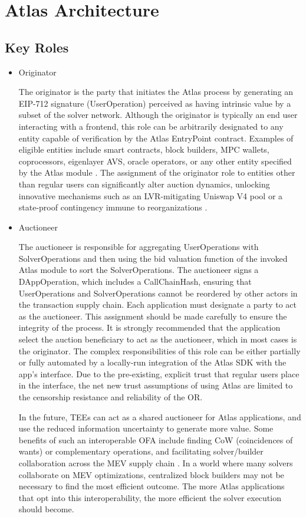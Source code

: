 \documentclass{article}
\begin{document}
\section{Atlas Architecture}

\subsection{Key Roles}
\begin{itemize}
\item Originator

The originator is the party that initiates the Atlas process by generating an EIP-712 signature (UserOperation) perceived as having intrinsic value by a subset of the solver network. Although the originator is typically an end user interacting with a frontend, this role can be arbitrarily designated to any entity capable of verification by the Atlas EntryPoint contract. Examples of eligible entities include smart contracts, block builders, MPC wallets, coprocessors, eigenlayer AVS, oracle operators, or any other entity specified by the Atlas module \cite{eigen}. The assignment of the originator role to entities other than regular users can significantly alter auction dynamics, unlocking innovative mechanisms such as an LVR-mitigating Uniswap V4 pool or a state-proof contingency immune to reorganizations \cite{lvr}. 


\item Auctioneer

The auctioneer is responsible for aggregating UserOperations with SolverOperations and then using the bid valuation function of the invoked Atlas module to sort the SolverOperations. The auctioneer signs a DAppOperation, which includes a CallChainHash, ensuring that UserOperations and SolverOperations cannot be reordered by other actors in the transaction supply chain. Each application must designate a party to act as the auctioneer. This assignment should be made carefully to ensure the integrity of the process. It is strongly recommended that the application select the auction beneficiary to act as the auctioneer, which in most cases is the originator. The complex responsibilities of this role can be either partially or fully automated by a locally-run integration of the Atlas SDK with the app’s interface. Due to the pre-existing, explicit trust that regular users place in the interface, the net new trust assumptions of using Atlas are limited to the censorship resistance and reliability of the OR. 

In the future, TEEs can act as a shared auctioneer for Atlas applications, and use the reduced information uncertainty to generate more value. Some benefits of such an interoperable OFA include finding CoW (coincidences of wants) or complementary operations, and facilitating solver/builder collaboration across the MEV supply chain \cite{cow}. In a world where many solvers collaborate on MEV optimizations, centralized block builders may not be necessary to find the most efficient outcome. The more Atlas applications that opt into this interoperability, the more efficient the solver execution should become.



\end{itemize}
\end{document}
